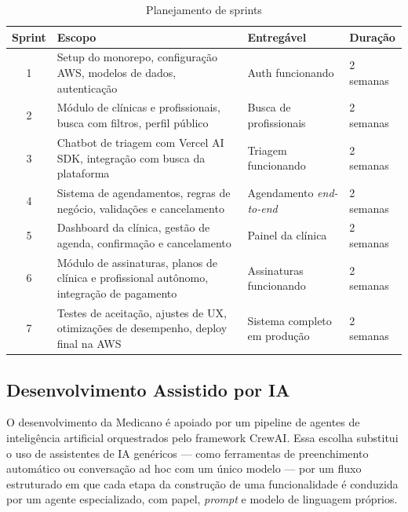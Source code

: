 \begin{table}[H]
  \centering
  \caption{Planejamento de sprints}
  \label{tab:sprints}
  \begin{tabular}{cp{6cm}p{3.5cm}p{2cm}}
    \toprule
    \textbf{Sprint} &
    \textbf{Escopo} &
    \textbf{Entregável} &
    \textbf{Duração} \\
    \midrule
    1 & Setup do monorepo, configuração AWS,
        modelos de dados, autenticação
      & Auth funcionando
      & 2 semanas \\
    \midrule
    2 & Módulo de clínicas e profissionais,
        busca com filtros, perfil público
      & Busca de profissionais
      & 2 semanas \\
    \midrule
    3 & Chatbot de triagem com Vercel AI SDK,
        integração com busca da plataforma
      & Triagem funcionando
      & 2 semanas \\
    \midrule
    4 & Sistema de agendamentos, regras de
        negócio, validações e cancelamento
      & Agendamento \textit{end-to-end}
      & 2 semanas \\
    \midrule
    5 & Dashboard da clínica, gestão de agenda,
        confirmação e cancelamento
      & Painel da clínica
      & 2 semanas \\
    \midrule
    6 & Módulo de assinaturas, planos de clínica
        e profissional autônomo, integração de
        pagamento
      & Assinaturas funcionando
      & 2 semanas \\
    \midrule
    7 & Testes de aceitação, ajustes de UX,
        otimizações de desempenho, deploy
        final na AWS
      & Sistema completo em produção
      & 2 semanas \\
    \bottomrule
  \end{tabular}
\end{table}

\subsection{Desenvolvimento Assistido por IA}
\label{subsec:ai-assisted-dev}

O desenvolvimento da Medicano é apoiado por um pipeline
de agentes de inteligência artificial orquestrados pelo
framework CrewAI. Essa escolha substitui o uso de
assistentes de IA genéricos --- como ferramentas de
preenchimento automático ou conversação ad hoc com um
único modelo --- por um fluxo estruturado em que cada
etapa da construção de uma funcionalidade é conduzida
por um agente especializado, com papel, \textit{prompt}
e modelo de linguagem próprios.

